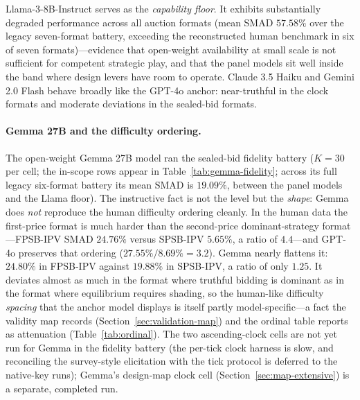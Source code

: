 Llama-3-8B-Instruct serves as the \emph{capability floor}. It exhibits substantially degraded performance across all auction formats (mean SMAD $57.58\%$ over the legacy seven-format battery, exceeding the reconstructed human benchmark in six of seven formats)---evidence that open-weight availability at small scale is not sufficient for competent strategic play, and that the panel models sit well inside the band where design levers have room to operate. Claude 3.5 Haiku and Gemini 2.0 Flash behave broadly like the GPT-4o anchor: near-truthful in the clock formats and moderate deviations in the sealed-bid formats.  

\paragraph{Gemma 27B and the difficulty ordering.}
The open-weight Gemma 27B model ran the sealed-bid fidelity battery ($K=30$ per cell; the in-scope rows appear in Table~\ref{tab:gemma-fidelity}; across its full legacy six-format battery its mean SMAD is $19.09\%$, between the panel models and the Llama floor). The instructive fact is not the level but the \emph{shape}: Gemma does \emph{not} reproduce the human difficulty ordering cleanly. In the human data the first-price format is much harder than the second-price dominant-strategy format---FPSB-IPV SMAD $24.76\%$ versus SPSB-IPV $5.65\%$, a ratio of $4.4$---and GPT-4o preserves that ordering ($27.55\%/8.69\% = 3.2$). Gemma nearly flattens it: $24.80\%$ in FPSB-IPV against $19.88\%$ in SPSB-IPV, a ratio of only $1.25$. It deviates almost as much in the format where truthful bidding is dominant as in the format where equilibrium requires shading, so the human-like difficulty \emph{spacing} that the anchor model displays is itself partly model-specific---a fact the validity map records (Section~\ref{sec:validation-map}) and the ordinal table reports as attenuation (Table~\ref{tab:ordinal}). The two ascending-clock cells are not yet run for Gemma in the fidelity battery (the per-tick clock harness is slow, and reconciling the survey-style elicitation with the tick protocol is deferred to the native-key runs); Gemma's design-map clock cell (Section~\ref{sec:map-extensive}) is a separate, completed run. 

